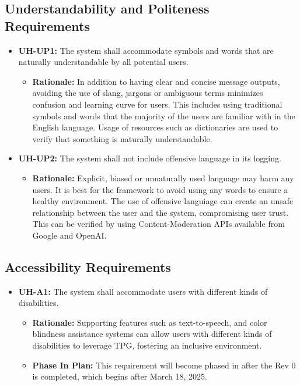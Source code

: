 \documentclass[12pt]{article}
\begin{document}
\subsection{Understandability and Politeness Requirements}
\begin{itemize}
  \item \label{UH-UP1} \textbf{UH-UP1:} The system shall accommodate symbols and words that are naturally understandable by all potential users.
  \begin{itemize}
    \item \textbf{Rationale:} In addition to having clear and concise message outputs, avoiding the use of slang, jargons or ambiguous terms minimizes confusion and learning curve for users. This includes using traditional symbols and words that the majority of the users are familiar with in the English language. Usage of resources such as dictionaries are used to verify that something is naturally understandable.
  \end{itemize}
  \item \label{UH-UP2} \textbf{UH-UP2:} The system shall not include offensive language in its logging.
  \begin{itemize}
    \item \textbf{Rationale:} Explicit, biased or unnaturally used language may harm any users. It is best for the framework to avoid using any words to ensure a healthy environment. The use of offensive languiage can create an unsafe relationship between the user and the system, compromising user trust. This can be verified by using Content-Moderation APIs available from Google and OpenAI.
  \end{itemize}
\end{itemize}

\subsection{Accessibility Requirements}
\begin{itemize}
  \item \label{UH-A1} \textbf{UH-A1:} The system shall accommodate users with different kinds of disabilities.
  \begin{itemize}
    \item \textbf{Rationale:} Supporting features such as text-to-speech, and color blindness assistance systems can allow users with different kinds of disabilities to leverage TPG, fostering an inclusive environment.
    \item \textbf{Phase In Plan:} This requirement will become phased in after the Rev 0 is completed, which begins after March 18, 2025.
  \end{itemize}
\end{itemize}
\end{document}
